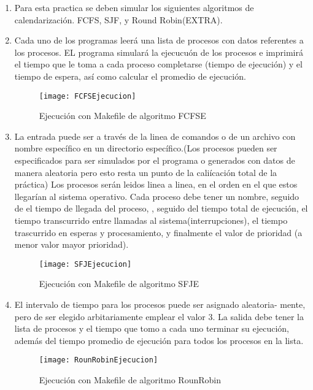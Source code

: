 \documentclass[a4paperx]{article}
\begin{document}
\begin{enumerate}

\item{Para esta practica se deben simular los siguientes algoritmos de calendarizaci\'on. FCFS, SJF, y Round Robin(EXTRA).}\\

\item{Cada uno de los programas leer\'a una lista de procesos con datos referentes a los procesos. EL programa simular\'a la ejecucu\'on de los procesos e imprimir\'a el tiempo que le toma a cada proceso completarse (tiempo de ejecuci\'on) y el tiempo de espera, as\'i como calcular el promedio de ejecuci\'on.}\\

\begin{figure}[H]
\centering
\texttt{[image: FCFSEjecucion]}
\caption{Ejecuci\'on con Makefile de algoritmo FCFSE}
\end{figure}

\item{La entrada puede ser a trav\'es de la linea de comandos o de un archivo
con nombre espec\'ifico en un directorio espec\'ifico.(Los procesos pueden ser
especificados para ser simulados por el programa o generados con datos de
manera aleatoria pero esto resta un punto de la cali\'icaci\'on total de la pr\'actica) Los procesos ser\'an leidos linea a linea, en el orden en el que estos llegar\'ian al sistema operativo. Cada proceso debe tener un nombre, seguido
de el tiempo de llegada del proceso, , seguido del tiempo total de ejecuci\'on, el tiempo transcurrido entre llamadas al sistema(interrupciones),
el tiempo trascurrido en esperas y procesamiento, y finalmente el valor de
prioridad (a menor valor mayor prioridad). }\\

\begin{figure}[H]
\centering
\texttt{[image: SFJEjecucion]}
\caption{Ejecuci\'on con Makefile de algoritmo SFJE}
\end{figure}

\item{El intervalo de tiempo para los procesos puede ser asignado aleatoria-
mente, pero de ser elegido arbitariamente emplear el valor 3. La salida
debe tener la lista de procesos y el tiempo que tomo a cada uno terminar su ejecuci\'on, adem\'as del tiempo promedio de ejecuci\'on para todos los
procesos en la lista.}\\

\begin{figure}[H]
\centering
\texttt{[image: RounRobinEjecucion]}
\caption{Ejecuci\'on con Makefile de algoritmo RounRobin}
\end{figure}

\end{enumerate}
\end{document}
